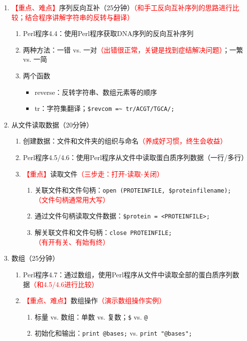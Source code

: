 \documentclass{TIJMUjiaoanLL}
\begin{document}
\begin{enumerate}
  \item \textcolor{red}{【重点、难点】}序列反向互补（25分钟）\textcolor{red}{（和手工反向互补序列的思路进行比较；结合程序讲解字符串的反转与翻译）}
    \begin{enumerate}
      \item Perl程序4.4：使用Perl程序获取DNA序列的反向互补序列
      \item 两种方法：一错 vs. 一对\textcolor{red}{（出错很正常，关键是找到症结解决问题）}；一繁 vs. 一简
      \item 两个函数
	\begin{itemize}
	  \item reverse：反转字符串、数组元素等的顺序
	  \item tr：字符集翻译；\verb|$revcom =~ tr/ACGT/TGCA/;|
	\end{itemize}
    \end{enumerate}
  \item 从文件读取数据（20分钟）
    \begin{enumerate}
      \item 创建数据：文件和文件夹的组织与命名\textcolor{red}{（养成好习惯，终生会收益）}
      \item Perl程序4.5/4.6：使用Perl程序从文件中读取蛋白质序列数据（一行/多行）
      \item \textcolor{red}{【重点】}读取文件\textcolor{red}{（三步走：打开-读取-关闭）}
	\begin{enumerate}
	  \item 关联文件和文件句柄：\verb|open (PROTEINFILE, $proteinfilename);|\textcolor{red}{（文件句柄通常用大写）}
	  \item 通过文件句柄读取文件数据：\verb|$protein = <PROTEINFILE>;|
	  \item 解关联文件和文件句柄：\verb|close PROTEINFILE;|\textcolor{red}{（有开有关、有始有终）}
	\end{enumerate}
    \end{enumerate}
  \item 数组（25分钟）
    \begin{enumerate}
      \item Perl程序4.7：通过数组，使用Perl程序从文件中读取全部的蛋白质序列数据\textcolor{red}{（和4.5/4.6进行比较）}
      \item \textcolor{red}{【重点、难点】}数组操作\textcolor{red}{（演示数组操作实例）}
	\begin{enumerate}
	  \item 标量 vs. 数组：单数 vs. 复数；\verb|$| vs. \verb|@|
	  \item 初始化和输出：\verb|print @bases;| vs. \verb|print "@bases";|

\end{enumerate}
\end{enumerate}
\end{enumerate}
\end{document}
